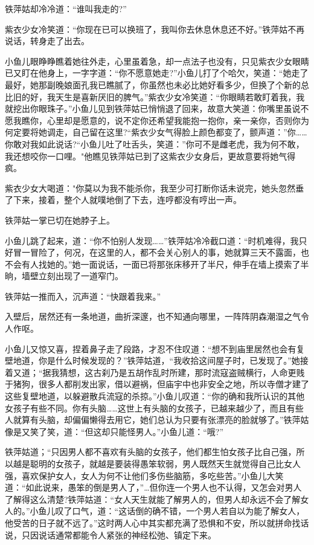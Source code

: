 \documentclass[12pt,oneside]{book}
\begin{document}
铁萍姑却冷冷道：``谁叫我走的?''

紫衣少女冷笑道：``你现在已可以换班了，我叫你去休息休息还不好。''铁萍姑不再说话，转身走了出去。

小鱼儿眼睁睁瞧着她往外走，心里虽着急，却一点法子也没有，只见紫衣少女眼睛已又盯在他身上，一字字道：``你不愿意她走?''小鱼儿打了个哈欠，笑道：``她走了最好，她那副晚娘面孔我已瞧腻了，你虽然也未必比她好看多少，但换了个新的总比旧的好，我天生是喜新厌旧的脾气。''紫衣少女冷笑道：``你眼睛若敢盯着我，我就挖出你眼珠子。''小鱼儿见到铁萍姑已悄悄退了回来，故意大笑道：你嘴里虽说不愿我瞧你，心里却是愿意的，说不定你还希望我能抱一抱你，亲一亲你，否则你为何定要将她调走，自己留在这里?``紫衣少女气得脸上颜色都变了，颤声道：''你\ldots\ldots 你敢对我如此说话?``小鱼儿吐了吐舌头，笑道：''你可不是雌老虎，我为何不敢，我还想咬你一口哩。"他瞧见铁萍姑已到了这紫衣少女身后，更故意要将她气得疯。

紫衣少女大喝道："你莫以为我不能杀你，我至少可打断你话未说完，她头忽然垂了下来，接着，整个人就噗地倒了下去，连哼都没有哼出一声。

铁萍姑一掌已切在她脖子上。

小鱼儿跳了起来，道：``你不怕别人发现\ldots\ldots{}''铁萍姑冷冷截口道：``时机难得，我只好冒一冒险了，何况，在这里的人，都不会关心别人的事，她就算三天不露面，也不会有人找她的。''她一面说话，一面已将那张床移开了半尺，伸手在墙上摸索了半晌，墙壁立刻出现了一道窄门。

铁萍姑一推而入，沉声道：``快跟着我来。''

入壁后，居然还有一条地道，曲折深邃，也不知通向哪里，一阵阵阴森潮湿之气令人作呕。

小鱼儿又惊又喜，捏着鼻子走了段路，才忍不住叹道：``想不到庙里居然也会有复壁地道，你是什么时候发现的？''铁萍姑道，``我收拾这间屋子时，已发现了。''她接着又道；``据我猜想，这古刹乃是五胡作乱时所建，那时流寇盗贼横行，人命更贱于猪狗，很多人都削发出家，借以避祸，但庙宇中也非安全之地，所以寺僧才建了这些复壁地道，以躲避散兵流寇的杀掠。''小鱼儿叹道：``你的确和我所认识的其他女孩子有些不同。你有头脑\ldots\ldots 这世上有头脑的女孩子，已越来越少了，而且有些人就算有头脑，却偏偏懒得去用它，她们总认为只要有张漂亮的脸就够了。''铁萍姑像是又笑了笑，道：``但这却只能怪男人。''小鱼儿道：``哦?''

铁萍姑道；``只因男人都不喜欢有头脑的女孩子，他们都生怕女孩子比自己强，所以越是聪明的女孩子，就越是要装得愚笨软弱，男人既然天生就觉得自己比女人强，喜欢保护女人，女人为何不让他们多伤些脑筋，多吃些苦。''小鱼儿大笑道：``如此说来，愚笨的倒是男人了，''\ldots 但你连一个男人也不认得，又怎会对男人了解得这么清楚?铁萍姑道：``女人天生就能了解男人的，但男人却永远不会了解女人的。''小鱼儿叹了口气，道：``这话倒的确不错，一个男人若自以为能了解女人，他受苦的日子就不远了。''这时两人心中其实都充满了恐惧和不安，所以就拼命找话说，只因说话通常都能令人紧张的神经松弛、镇定下来。
\end{document}
